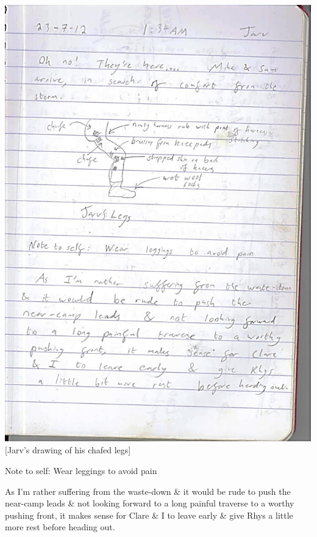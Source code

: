 \includegraphics{UgLog1012/71.jpeg}\\
{[}Jarv's drawing of his chafed legs{]}

Note to self: Wear leggings to avoid pain

As I'm rather suffering from the waste-down \& it would be rude to push
the near-camp leads \& not looking forward to a long painful traverse to
a worthy pushing front, it makes sense for Clare \& I to leave early \&
give Rhys a little more rest before heading out.

